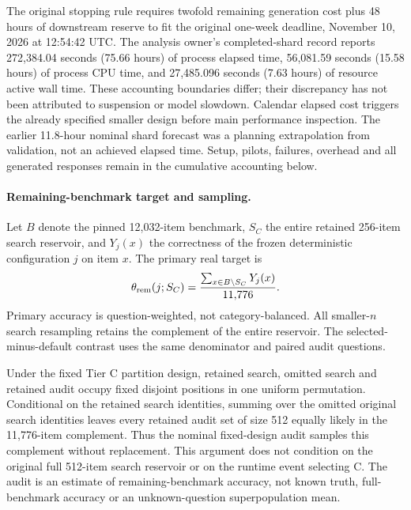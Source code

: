 The original stopping rule requires twofold remaining generation cost plus 48 hours of downstream reserve to fit the original one-week deadline, November 10, 2026 at 12:54:42 UTC. The analysis owner's completed-shard record reports 272,384.04 seconds (75.66 hours) of process elapsed time, 56,081.59 seconds (15.58 hours) of process CPU time, and 27,485.096 seconds (7.63 hours) of resource active wall time. These accounting boundaries differ; their discrepancy has not been attributed to suspension or model slowdown. Calendar elapsed cost triggers the already specified smaller design before main performance inspection. The earlier 11.8-hour nominal shard forecast was a planning extrapolation from validation, not an achieved elapsed time. Setup, pilots, failures, overhead and all generated responses remain in the cumulative accounting below.

\paragraph{Remaining-benchmark target and sampling.}
Let $B$ denote the pinned 12,032-item benchmark, $S_C$ the entire retained 256-item search reservoir, and $Y_j(x)$ the correctness of the frozen deterministic configuration $j$ on item $x$. The primary real target is
\begin{equation}
 \theta_{\rm rem}(j;S_C)=
 \frac{\sum_{x\in B\setminus S_C}Y_j(x)}{11{,}776}.
\end{equation}
Primary accuracy is question-weighted, not category-balanced. All smaller-$n$ search resampling retains the complement of the entire reservoir. The selected-minus-default contrast uses the same denominator and paired audit questions.

Under the fixed Tier C partition design, retained search, omitted search and retained audit occupy fixed disjoint positions in one uniform permutation. Conditional on the retained search identities, summing over the omitted original search identities leaves every retained audit set of size 512 equally likely in the 11,776-item complement. Thus the nominal fixed-design audit samples this complement without replacement. This argument does not condition on the original full 512-item search reservoir or on the runtime event selecting C. The audit is an estimate of remaining-benchmark accuracy, not known truth, full-benchmark accuracy or an unknown-question superpopulation mean.

